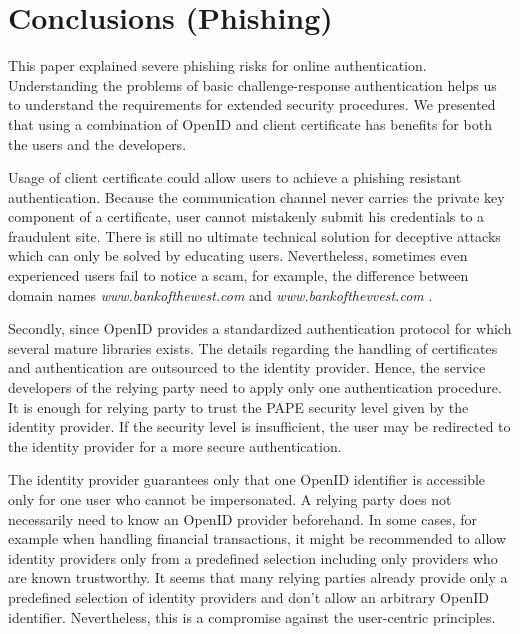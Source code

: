 \documentclass[english,gradu]{tktltiki}
\begin{document}
\section{Conclusions (Phishing)} %
\label{sec:conclusions_phishing_}

                 This paper explained severe phishing risks for online authentication. Understanding the problems of basic challenge-response authentication helps us to understand the requirements for extended security procedures. We presented that using a combination of OpenID and client certificate has benefits for both the users and the developers.

                 Usage of client certificate could allow users to achieve a phishing resistant authentication. Because the communication channel never carries the private key component of a certificate, user cannot mistakenly submit his credentials to a fraudulent site. There is still no ultimate technical solution for deceptive attacks which can only be solved by educating users. Nevertheless, sometimes even experienced users fail to notice a scam, for example, the difference between domain names
           \emph{www.bankofthewest.com} and \emph{www.bankofthevvest.com} \cite{why_phishing_works_06}.

                 Secondly, since OpenID provides a standardized authentication protocol for which several mature libraries exists. The details regarding the handling of certificates and authentication are outsourced to the identity provider. Hence, the service developers of the relying party need to apply only one authentication procedure. It is enough for relying party to trust the PAPE security level given by the identity provider. If the security level is insufficient, the user may be redirected to the identity provider for a more secure authentication.

                 The identity provider guarantees only that one OpenID identifier is accessible only for one user who cannot be impersonated. A relying party does not necessarily need to know an OpenID provider beforehand. In some cases, for example when handling financial transactions, it might be recommended to allow identity providers only from a predefined selection including only providers who are known trustworthy. It seems that many relying parties already provide only a predefined selection of identity providers and don't allow an arbitrary OpenID identifier. Nevertheless, this is a compromise against the user-centric principles.
\end{document}
